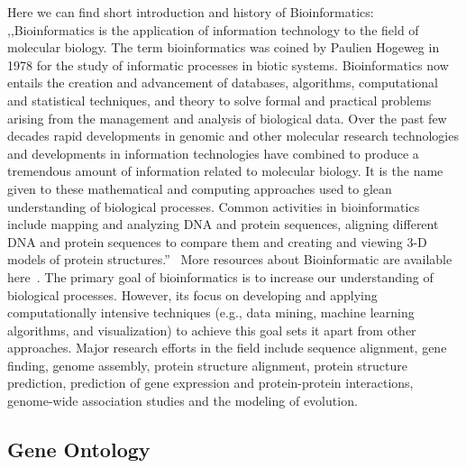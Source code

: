 Here we can find short introduction and history of Bioinformatics: ,,Bioinformatics is the application of information technology to the field of molecular biology.
The term bioinformatics was coined by Paulien Hogeweg in 1978 for the study of informatic processes in biotic systems.
Bioinformatics now entails the creation and advancement of databases, algorithms, computational and statistical techniques, and theory to solve formal and practical problems arising from the management and analysis of biological data.
Over the past few decades rapid developments in genomic and other molecular research technologies and developments in information technologies have combined to produce a tremendous amount of information related to molecular biology.
It is the name given to these mathematical and computing approaches used to glean understanding of biological processes.
Common activities in bioinformatics include mapping and analyzing DNA and protein sequences, aligning different DNA and protein sequences to compare them and creating and viewing 3-D models of protein structures.''~\cite{Bioinformatic}
More resources about Bioinformatic are available here~\cite{Bioinformatic_resources}.
The primary goal of bioinformatics is to increase our understanding of biological processes.
However, its focus on developing and applying computationally intensive techniques (e.g., data mining, machine learning algorithms, and visualization) to achieve this goal sets it apart from other approaches.
Major research efforts in the field include sequence alignment, gene finding, genome assembly, protein structure alignment, protein structure prediction, prediction of gene expression and protein-protein interactions, genome-wide association studies and the modeling of evolution.

\subsection{Gene Ontology}
\label{sec:gene_ontology}

